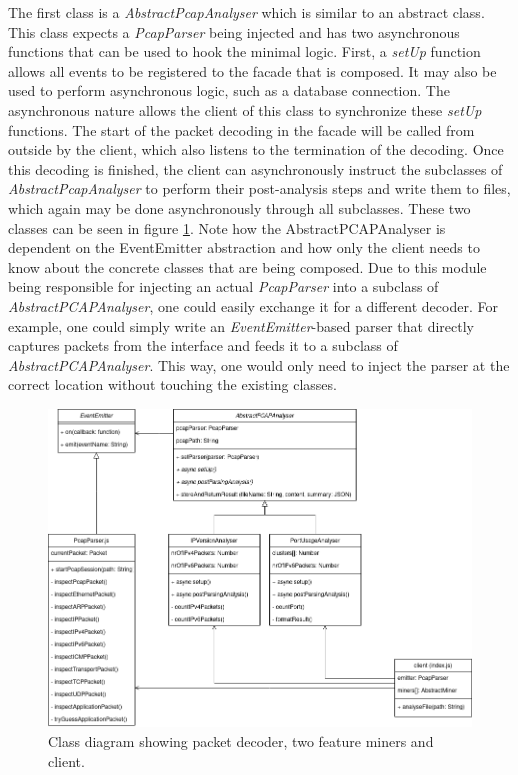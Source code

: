 The first class is a \textit{AbstractPcapAnalyser} which is similar to an abstract class. This class expects a  \textit{PcapParser} being injected and has two asynchronous functions that can be used to hook the minimal logic. First, a \textit{setUp} function allows all events to be registered to the facade that is composed. It may also be used to perform asynchronous logic, such as a database connection. The asynchronous nature allows the client of this class to synchronize these \textit{setUp} functions.
The start of the packet decoding in the facade will be called from outside by the client, which also listens to the termination of the decoding. Once this decoding is finished, the client can asynchronously instruct the subclasses of \textit{AbstractPcapAnalyser} to perform their post-analysis steps and write them to files, which again may be done asynchronously through all subclasses.
These two classes can be seen in figure \ref{fig:classdiagrambackend}. Note how the AbstractPCAPAnalyser is dependent on the EventEmitter abstraction and how only the client needs to know about the concrete classes that are being composed. Due to this module being responsible for injecting an actual \textit{PcapParser} into a subclass of \textit{AbstractPCAPAnalyser}, one could easily exchange it for a different decoder. For example, one could simply write an \textit{EventEmitter}-based parser that directly captures packets from the interface and feeds it to a subclass of \textit{AbstractPCAPAnalyser}. This way, one would only need to inject the parser at the correct location without touching the existing classes.
\begin{figure}
    \centering
    \includegraphics[width=14cm]{images/backend-miners(2).png}
    \caption{Class diagram showing packet decoder, two feature miners and client.}
    \label{fig:classdiagrambackend}
\end{figure}
